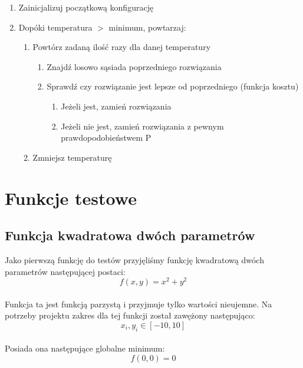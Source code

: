 \documentclass[twoside]{projektInzynierskiMS1}
\newcommand{\si}{ś}
\begin{document}
\begin{enumerate}
	\item Zainicjalizuj początkową konfigurację
	\item Dopóki temperatura $>$ minimum, powtarzaj:
	\begin{enumerate}
		\item Powtórz zadaną ilość razy dla danej temperatury
		\begin{enumerate}
			\item Znajdź losowo sąsiada poprzedniego rozwiązania
			\item Sprawdź czy rozwiązanie jest lepsze od poprzedniego (funkcja kosztu)
			\begin{enumerate}
				\item Jeżeli jest, zamień rozwiązania
				\item Jeżeli nie jest, zamień rozwiązania z pewnym prawdopodobieństwem P
			\end{enumerate}
		\end{enumerate}
		\item Zmniejsz temperaturę
	\end{enumerate}
\end{enumerate}
		

\section{Funkcje testowe}
	\subsection{Funkcja kwadratowa dwóch parametrów}
	Jako pierwszą funkcję do testów przyjęli\si my funkcję kwadratową dwóch parametrów następującej postaci:
\[f(x, y) = x^2 + y^2 \] \\

Funkcja ta jest funkcją parzystą i przyjmuje tylko warto\si ci nieujemne. Na potrzeby projektu zakres dla tej funkcji został zawężony następująco:
\[x_i, y_i \in [-10, 10] \] \\

Posiada ona następujące globalne minimum:
\[ f(0, 0) = 0 \] \\
\end{document}
